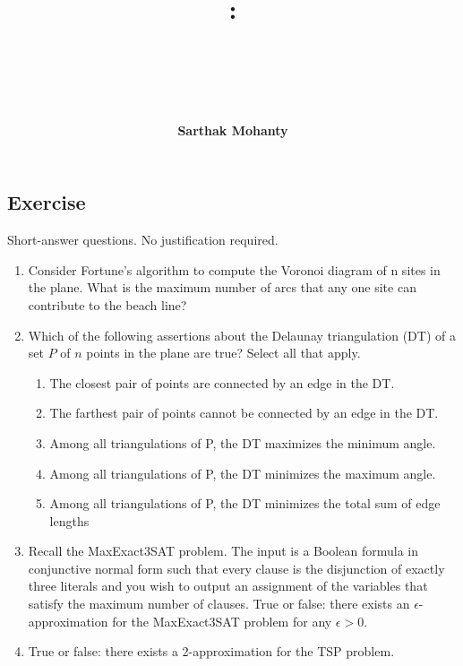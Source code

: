 \documentclass[14pt]{extreport}
\title{
    \vspace{1.75in}
    \textbf{\lectClass:\\ \lectTitle}\\
    \vspace{0.1in}\large{\textit{\lectClassInstructor\ \lectSection}}
    \vspace{2in}
    \author{\textbf{Sarthak Mohanty}}
    \date{}
}
\newcounter{counter}
\newcommand{\Exercise}{Exercise \stepcounter{counter}\thecounter}
\begin{document}
\maketitle
\pagebreak

\subsection*{\Exercise}
Short-answer questions. No justification required.
\begin{enumerate}
    \item Consider Fortune’s algorithm to compute the Voronoi diagram of n sites in
    the plane. What is the maximum number of arcs that any one site can contribute to the
    beach line?
    \item Which of the following assertions about the Delaunay triangulation (DT) of
    a set $P$ of $n$ points in the plane are true? Select all that apply.
    \begin{enumerate}[label=\roman*.]
    \small
        \item The closest pair of points are connected by an edge in the DT.
        \item The farthest pair of points cannot be connected by an edge in the DT.
        \item Among all triangulations of P, the DT maximizes the minimum angle.
        \item Among all triangulations of P, the DT minimizes the maximum angle.
        \item Among all triangulations of P, the DT minimizes the total sum of edge lengths
    \end{enumerate}
    \item Recall the \textsf{MaxExact3SAT} problem. The input is a Boolean formula in conjunctive normal form such that every clause is the disjunction of exactly three literals and you wish to output an assignment of the variables that satisfy the maximum number of clauses. True or false: there exists an $\epsilon$-approximation for the \textsf{MaxExact3SAT} problem for any $\epsilon > 0$.
    \item True or false: there exists a 2-approximation for the \textsf{TSP} problem.
\end{enumerate}
\end{document}
